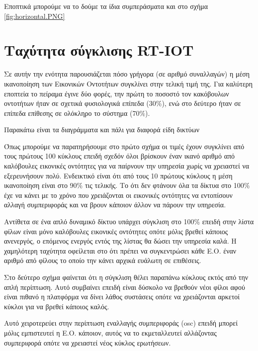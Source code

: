 Εποπτικά μπορούμε να το δούμε τα ίδια συμπεράσματα και στο σχήμα \ref{fig:horizontal.PNG}
 
\newpage
\section{Ταχύτητα σύγκλισης RT-IOT}

Σε αυτήν την ενότητα παρουσιάζεται πόσο γρήγορα (σε αριθμό συναλλαγών) η μέση ικανοποίηση των Εικονικών Οντοτήτων συγκλίνει στην τελική τιμή της. Για καλύτερη εποπτεία το πείραμα έγινε δύο φορές, την πρώτη το ποσοστό τον κακόβουλων οντοτήτων ήταν σε σχετικά φυσιολογικά επίπεδα (30\%), ενώ στο δεύτερο ήταν σε επίπεδα επίθεσης σε ολόκληρο το σύστημα (70\%). 

Παρακάτω είναι τα διαγράμματα και πάλι για διαφορά είδη δικτύων



Όπως μπορούμε να παρατηρήσουμε στο πρώτο σχήμα οι τιμές έχουν συγκλίνει από τους πρώτους 100 κύκλους επειδή σχεδόν όλοι βρίσκουν έναν ικανό αριθμό από καλόβουλες εικονικές οντότητες για να παίρνουν την υπηρεσία χωρίς να χρειαστεί να εξερευνήσουν πολύ. Ενδεικτικό είναι ότι από τους 10 πρώτους κύκλους η μέση ικανοποίηση είναι στο 90\% τις τελικής. Το ότι δεν φτάνουν όλα τα δίκτυα στο 100\% έχε να κάνει με το χρόνο που χρειάζονται οι εικονικές οντότητες να εντοπίσουν αλλαγή συμπεριφοράς και να βρουν κάποιον άλλον να πάρουν την υπηρεσία. 

Αντίθετα σε ένα απλό δυναμικό δίκτυο υπάρχει σύγκλιση στο 100\% επειδή στην λίστα φίλων είναι μόνο καλόβουλες εικονικές οντότητες οπότε μόλις βρεθεί κάποιος ανενεργός, ο επόμενος ενεργός εντός της λίστας θα δώσει την υπηρεσία καλά. Η χαμηλότερη ταχύτητα οφείλεται στο ότι πρέπει να συγκεντρώσει κάθε Ε.Ο. έναν αριθμό από φίλους το οποίο την κάνει αρχικά ευάλωτη σε επιθέσεις.

Στο δεύτερο σχήμα φαίνεται ότι η σύγκλιση θέλει παραπάνω κύκλους εκτός από την απλή περίπτωση. Αυτό συμβαίνει επειδή είναι δύσκολο να βρεθούν νέοι φίλοι αφού είναι πιθανό η πλατφόρμα να δίνει λάθος συστάσεις οπότε να χρειάζονται αρκετοί κύκλοι για να βρεθεί κάποιος καλός. 


Αυτό χειροτερεύει στην περίπτωση εναλλαγής συμπεριφοράς (osc) επειδή μπορεί μόλις εμπιστευτεί η Ε.Ο. κάποιον, αυτός να το εκμεταλλευτεί αλλάζοντας συμπεριφορά οπότε να χρειαστεί νέος κύκλος ερωτήσεων.
\newpage

